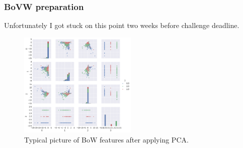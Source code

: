 \begin{frame}\frametitle{BoVW preparation}
\par Unfortunately I got stuck on this point two weeks before challenge deadline.
\begin{center}
\begin{figure}
\includegraphics[width=0.5\textwidth]{pics/bow_pca_results.png}
\caption{Typical picture of BoW features  after applying PCA.}
\end{figure}
\end{center}
\end{frame}